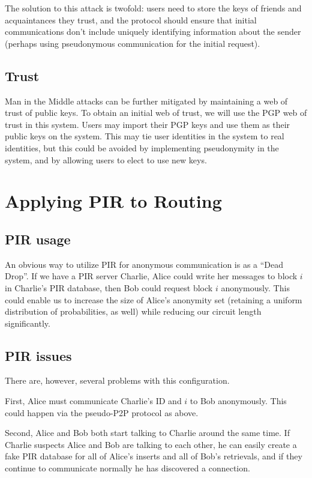 \documentclass[twocolumn,11pt,english]{article}
\begin{document}
The solution to this attack is twofold: users need to store the keys of friends and acquaintances they trust, and the protocol should ensure that initial communications don't include uniquely identifying information about the sender (perhaps using pseudonymous communication for the initial request).

\subsection{Trust}

Man in the Middle attacks can be further mitigated by maintaining a web of trust of public keys. To obtain an initial web of trust, we will use the PGP web of trust \cite{zimmermann1995official} in this system. Users may import their PGP keys and use them as their public keys on the system. This may tie user identities in the system to real identities, but this could be avoided by implementing pseudonymity in the system, and by allowing users to elect to use new keys. 



\section{Applying PIR to Routing}
\subsection{PIR usage}
An obvious way to utilize PIR for anonymous communication is as a ``Dead Drop''. If we have a PIR server Charlie, Alice could write her messages to block $i$ in Charlie's PIR database, then Bob could request block $i$ anonymously. This could enable us to increase the size of Alice's anonymity set (retaining a uniform distribution of probabilities, as well) while reducing our circuit length significantly. 

\subsection{PIR issues}
There are, however, several problems with this configuration.

First, Alice must communicate Charlie's ID and $i$ to Bob anonymously. This could happen via the pseudo-P2P protocol as above. 

Second, Alice and Bob both start talking to Charlie around the same time. If Charlie suspects Alice and Bob are talking to each other, he can easily create a fake PIR database for all of Alice's inserts and all of Bob's retrievals, and if they continue to communicate normally he has discovered a connection. 
\end{document}
